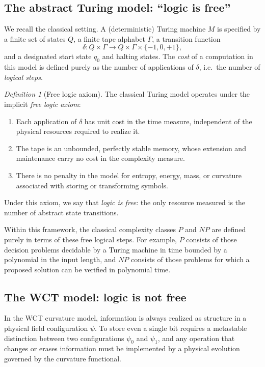 \documentclass[12pt]{article}
\theoremstyle{remark}
\newtheorem{definition}[theorem]{Definition}
\begin{document}
\subsection{The abstract Turing model: ``logic is free''}

We recall the classical setting. A (deterministic) Turing machine $M$
is specified by a finite set of states $Q$, a finite tape alphabet
$\Gamma$, a transition function
\[
  \delta : Q \times \Gamma \to Q \times \Gamma \times \{-1,0,+1\},
\]
and a designated start state $q_0$ and halting states. The \emph{cost}
of a computation in this model is defined purely as the number of
applications of $\delta$, i.e.\ the number of \emph{logical steps}.

\begin{definition}[Free logic axiom]
\label{def:free-logic-axiom}
The classical Turing model operates under the implicit \emph{free logic
axiom}:
\begin{enumerate}
  \item Each application of $\delta$ has unit cost in the time
  measure, independent of the physical resources required to realize
  it.
  \item The tape is an unbounded, perfectly stable memory, whose
  extension and maintenance carry no cost in the complexity measure.
  \item There is no penalty in the model for entropy, energy, mass, or
  curvature associated with storing or transforming symbols.
\end{enumerate}
Under this axiom, we say that \emph{logic is free}: the only resource
measured is the number of abstract state transitions.
\end{definition}

Within this framework, the classical complexity classes $P$ and $NP$
are defined purely in terms of these free logical steps. For example,
$P$ consists of those decision problems decidable by a Turing machine
in time bounded by a polynomial in the input length, and $NP$ consists
of those problems for which a proposed solution can be verified in
polynomial time.

\subsection{The WCT model: logic is not free}

In the WCT curvature model, information is always realized as
structure in a physical field configuration $\psi$. To store even a
single bit requires a metastable distinction between two
configurations $\psi_0$ and $\psi_1$, and any operation that changes
or erases information must be implemented by a physical evolution
governed by the curvature functional.
\end{document}
